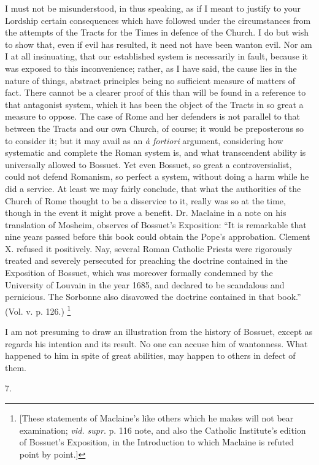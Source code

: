 I must not be misunderstood, in thus speaking, as
if I meant to justify to your Lordship certain consequences which have
followed under the circumstances from the attempts of the Tracts for
the Times in defence of the Church. I do but wish to show that, even
if evil has resulted, it need not have been wanton evil. Nor am I at
all insinuating, that our established system is necessarily in fault,
because it was exposed to this inconvenience; rather, as I have said,
the cause lies in the nature of things, abstract principles being no
sufficient measure of matters of fact. There cannot be a clearer
proof of this than will be found in a reference to that antagonist
system, which it has been the object of the Tracts in so great a
measure to oppose. The case of Rome and her defenders is not parallel
to that between the Tracts and our own Church, of course; it would be
preposterous so to consider it; but it may avail as an \emph{à fortiori}
argument, considering how systematic and complete the Roman system is,
and what transcendent ability is universally allowed to Bossuet. Yet
even Bossuet, so great a controversialist, could not defend Romanism,
so perfect a system, without doing a harm while he did a service. At
least we may fairly conclude, that what the authorities of the Church
of Rome thought to be a disservice to it, really was so at the time,
though in the event it might prove a benefit. Dr. Maclaine in a note
on his translation of Mosheim, observes of Bossuet's Exposition: ``It
is remarkable that nine years passed before this book could obtain the
Pope's approbation. Clement X. refused it positively. Nay, several
Roman Catholic Priests were rigorously treated and severely persecuted
for preaching the doctrine contained in the Exposition of Bossuet,
which was moreover formally condemned by the University of Louvain in
the year 1685, and declared to be scandalous and pernicious. The
Sorbonne also disavowed the doctrine contained in that book.'' (Vol. v.
p. 126.) \footnote{[These statements of Maclaine's like others
which he makes will not bear examination; \emph{vid. supr}. p. 116 note, and also the Catholic Institute's edition of Bossuet's
Exposition, in the Introduction to which Maclaine is refuted point by
point.]}

I am not presuming to draw an illustration from
the history of Bossuet, except as regards his intention and its
result. No one can accuse him of wantonness. What happened to him in
spite of great abilities, may happen to others in defect of them.

7.

